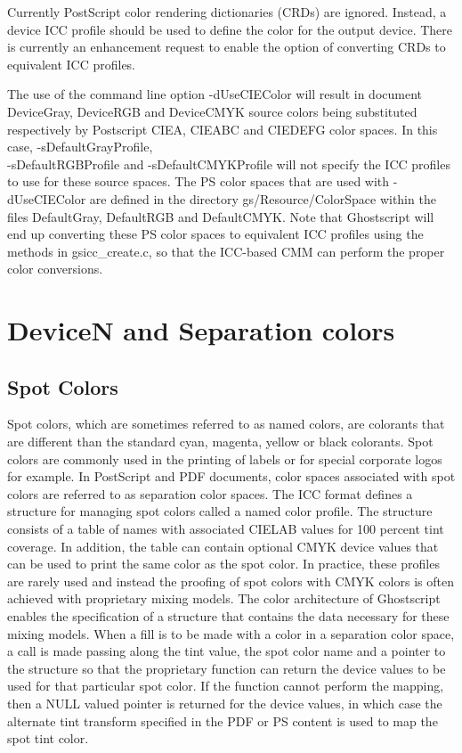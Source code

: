 \documentclass[12pt,notitlepage]{article}
\begin{document}
Currently PostScript color rendering dictionaries (CRDs) are ignored.  Instead, a device ICC profile should be used to define the color for the output device.  There is currently an enhancement request to enable the option of converting CRDs to equivalent ICC profiles.  

The use of the command line option -dUseCIEColor will result in document DeviceGray, DeviceRGB and DeviceCMYK source colors being substituted respectively by Postscript CIEA, CIEABC and CIEDEFG color spaces.  In this case, -sDefaultGrayProfile, \\
-sDefaultRGBProfile and -sDefaultCMYKProfile will not specify the ICC profiles to use for these source spaces.   The PS color spaces that are used with -dUseCIEColor are defined in the directory
gs/Resource/ColorSpace within the files DefaultGray, DefaultRGB and DefaultCMYK.   Note that Ghostscript will end up converting these PS color spaces to equivalent ICC profiles using the methods in gsicc\_create.c, so that the ICC-based CMM can perform the proper color conversions.

\section{DeviceN and Separation colors}

\subsection{Spot Colors}

Spot colors, which are sometimes referred to as named colors, are colorants that are different than the standard cyan, magenta, yellow or black colorants.  Spot colors are commonly used in the printing of labels or for special corporate logos for example.  In PostScript and PDF documents, color spaces associated with spot colors are referred to as separation color spaces.  The ICC format defines a structure for managing spot colors called a named color profile.  The structure consists of a table of names with associated CIELAB values for 100 percent tint coverage.  In addition, the table can contain optional CMYK device values that can be used to print the same color as the spot color.  In practice, these profiles are rarely used and instead the proofing of spot colors with CMYK colors is often achieved with proprietary mixing models.  The color architecture of Ghostscript enables the specification of a structure that contains the data necessary for these mixing models.  When a fill is to be made with a color in a separation color space, a call is made passing along the tint value, the spot color name and a pointer to the structure so that the proprietary function can return the device values to be used for that particular spot color.  If the function cannot perform the mapping, then a NULL valued pointer is returned for the device values, in which case the alternate tint transform specified in the PDF or PS content is used to map the spot tint color.
\end{document}
